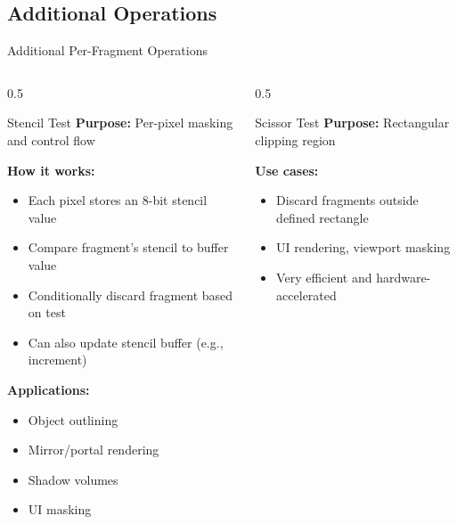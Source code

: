 \subsection{Additional Operations}
\begin{frame}{Additional Per-Fragment Operations}
  \scriptsize
  \begin{columns}
    \begin{column}{0.5\textwidth}
      \begin{raybox}{Stencil Test}
        \textbf{Purpose:} Per-pixel masking and control flow

        \textbf{How it works:}
        \begin{itemize}
          \item Each pixel stores an 8-bit stencil value
          \item Compare fragment’s stencil to buffer value
          \item Conditionally discard fragment based on test
          \item Can also update stencil buffer (e.g., increment)
        \end{itemize}

        \textbf{Applications:}
        \begin{itemize}
          \item Object outlining
          \item Mirror/portal rendering
          \item Shadow volumes
          \item UI masking
        \end{itemize}
      \end{raybox}
    \end{column}

    \begin{column}{0.5\textwidth}
      \begin{conceptbox}{Scissor Test}
        \textbf{Purpose:} Rectangular clipping region

        \vspace{0.2cm}
        \textbf{Use cases:}
        \begin{itemize}
          \item Discard fragments outside defined rectangle
          \item UI rendering, viewport masking
          \item Very efficient and hardware-accelerated
        \end{itemize}
      \end{conceptbox}


\end{column}
\end{columns}
\end{frame}

